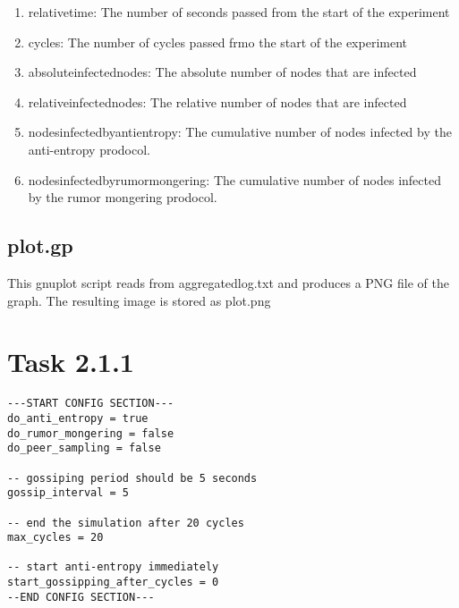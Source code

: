 \documentclass[a4paper]{article}
\begin{document}
\begin{enumerate}
\item relative\textunderscore time: The number of seconds passed from the start of the experiment
\item cycles: The number of cycles passed frmo the start of the experiment
\item absolute\textunderscore infected\textunderscore nodes: The absolute number of nodes that are infected
\item relative\textunderscore infected\textunderscore nodes: The relative number of nodes that are infected
\item nodes\textunderscore infected\textunderscore by\textunderscore anti\textunderscore entropy: The cumulative number of nodes infected by the anti-entropy prodocol.
\item nodes\textunderscore infected\textunderscore by\textunderscore rumor\textunderscore mongering: The cumulative number of nodes infected by the rumor mongering prodocol.
\end{enumerate}

\subsection{plot.gp}

This gnuplot script reads from aggregated\textunderscore log.txt and produces a PNG file of the graph. The resulting image is stored as plot.png

\section{Task 2.1.1}
\begin{lstlisting}
---START CONFIG SECTION---
do_anti_entropy = true
do_rumor_mongering = false
do_peer_sampling = false

-- gossiping period should be 5 seconds
gossip_interval = 5

-- end the simulation after 20 cycles
max_cycles = 20

-- start anti-entropy immediately
start_gossipping_after_cycles = 0
--END CONFIG SECTION---
\end{lstlisting}
\end{document}
